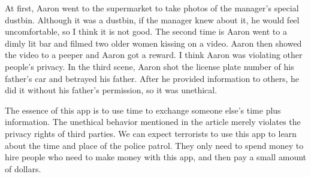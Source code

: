 \documentclass{article}
\begin{document}
At first, Aaron went to the supermarket to take photos of the manager's special dustbin. 
Although it was a dustbin, if the manager knew about it, 
he would feel uncomfortable, so I think it is not good.
 The second time is Aaron went to a dimly lit bar and filmed two older women kissing on a video.
  Aaron then showed the video to a peeper and Aaron got a reward. 
  I think Aaron was violating other people's privacy.
   In the third scene, Aaron shot the license plate number of his father's car and betrayed his father. 
   After he provided information to others, he did it without his father's permission, 
   so it was unethical.

  
The essence of this app is to use time to exchange someone else's time plus information.
The unethical behavior mentioned in the article merely violates the privacy rights of third parties.
We can expect terrorists to use this app to learn about the time and place of the police patrol.
They only need to spend money to hire people who need to make money with this app, 
and then pay a small amount of dollars.
\end{document}
